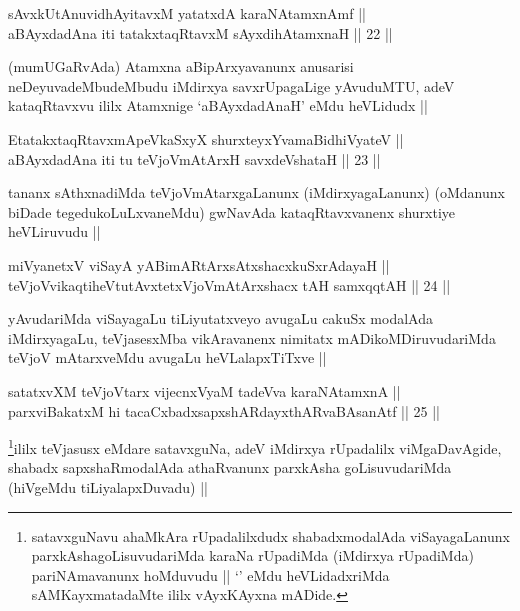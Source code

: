\begin{shl}
sAvxkUtAnuvidhAyitavxM yatatxdA karaNAtamxnAmf || \\
aBAyxdadAna iti tatakxtaqRtavxM sAyxdihA\s \s tamxnaH ||  22 ||  
\end{shl}

\begin{artha}
(mumUGaRvAda) Atamxna aBipArxyavanunx anusarisi neDeyuvadeMbudeMbudu
iMdirxya savxrUpagaLige yAvuduMTU, adeV kataqRtavxvu ililx Atamxnige
`aBAyxdadAnaH' eMdu heVLidudx ||
\end{artha}

\begin{shl}
EtatakxtaqRtavxmApeVkaSxyX shurxteyxYvamaBidhiVyateV || \\
aBAyxdadAna iti tu teVjoVmAtArxH savxdeVshataH ||  23 ||  
\end{shl}

\begin{artha}
tananx sAthxnadiMda teVjoVmAtarxgaLanunx (iMdirxyagaLanunx) (oMdanunx
biDade tegedukoLuLxvaneMdu) gwNavAda kataqRtavxvanenx shurxtiye
heVLiruvudu || 
\end{artha}


\begin{shl}
miVyanetxV viSayA yABimARtArxsAtxshacxkuSxrAdayaH || \\
teVjoVvikaqtiheVtutAvxtetxVjoVmAtArxshacx tAH samxqqtAH ||  24 ||  
\end{shl}

\begin{artha}
yAvudariMda viSayagaLu tiLiyutatxveyo avugaLu cakuSx modalAda
iMdirxyagaLu, teVjasesxMba vikAravanenx nimitatx mADikoMDiruvudariMda
teVjoV mAtarxveMdu avugaLu heVLalapxTiTxve ||
\end{artha}


\begin{shl}
satatxvXM teVjoV\s tarx vijecnxVyaM tadeVva karaNAtamxnA || \\
parxviBakatxM hi tacaCxbadxsapxshARdayxthARvaBAsanAtf ||  25 ||  
\end{shl}

\begin{artha}
\footnote[1]{satavxguNavu ahaMkAra rUpadalilxdudx shabadxmodalAda
viSayagaLanunx parxkAshagoLisuvudariMda karaNa rUpadiMda (iMdirxya
rUpadiMda) pariNAmavanunx hoMduvudu || `\stext' eMdu heVLidadxriMda
sAMKayxmatadaMte ililx vAyxKAyxna mADide.}ililx teVjasusx eMdare satavxguNa, adeV iMdirxya
rUpadalilx viMgaDavAgide, shabadx sapxshaRmodalAda athaRvanunx
parxkAsha goLisuvudariMda (hiVgeMdu tiLiyalapxDuvadu) ||
\end{artha}


